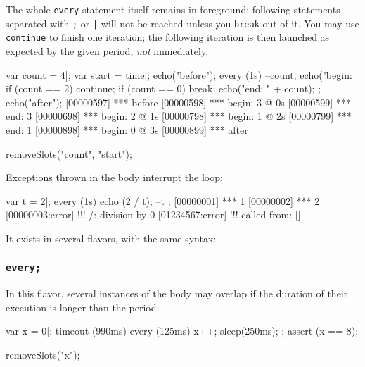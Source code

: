 The whole \lstinline{every} statement itself remains in foreground:
following statements separated with \lstinline';' or \lstinline'|' will not
be reached unless you \lstinline{break} out of it.  You may use
\lstinline{continue} to finish one iteration; the following iteration is
then launched as expected by the given period, \emph{not} immediately.

\begin{urbiscript}
var count = 4|;
var start = time|;
echo("before");
every (1s)
{
  --count;
  echo("begin: %
  if (count == 2)
    continue;
  if (count == 0)
    break;
  echo("end:   " + count);
};
echo("after");
[00000597] *** before
[00000598] *** begin: 3 @ 0s
[00000599] *** end:   3
[00000698] *** begin: 2 @ 1s
[00000798] *** begin: 1 @ 2s
[00000799] *** end:   1
[00000898] *** begin: 0 @ 3s
[00000899] *** after
\end{urbiscript}
\begin{urbicomment}
removeSlots("count", "start");
\end{urbicomment}

Exceptions thrown in the body interrupt the loop:

\begin{urbiscript}
var t = 2|;
every (1s) { echo (2 / t); --t };
[00000001] *** 1
[00000002] *** 2
[00000003:error] !!! /: division by 0
[01234567:error] !!!    called from: []
\end{urbiscript}

It exists in several flavors, with the same syntax:



\subsubsection{\lstinline{every;}}
\label{sec:lang:every:semi}

In this flavor, several instances of the body may overlap if the duration of
their execution is longer than the period:

\begin{urbiscript}
var x = 0|;
timeout (990ms)
  every (125ms)
  {
    x++;
    sleep(250ms);
  };
assert (x == 8);
\end{urbiscript}
\begin{urbicomment}
removeSlots("x");
\end{urbicomment}


